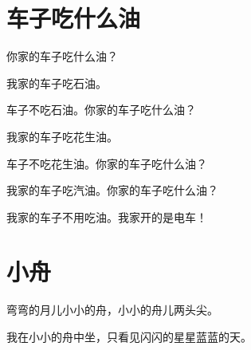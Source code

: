 \documentclass[12pt,UTF-8,openany]{ctexbook}
\begin{document}
\chapter{车子吃什么油}

\begin{large}
    
    你家的车子吃什么油？
    
    我家的车子吃石油。
    
    车子不吃石油。你家的车子吃什么油？
    
    我家的车子吃花生油。
    
    车子不吃花生油。你家的车子吃什么油？
    
    我家的车子吃汽油。你家的车子吃什么油？
    
    我家的车子不用吃油。我家开的是电车！
    
\end{large}


\clearpage

\begin{center}
    
\end{center}


\hanzibox{}\hanzibox{}\hanzibox{}\hanzibox{}\hspace{1em}\hanzibox{}\hanzibox{}\hanzibox{}\hanzibox{}

\hanzibox{}\hanzibox{}\hanzibox{}\hanzibox{}\hspace{1em}\hanzibox{}\hanzibox{}\hanzibox{}\hanzibox{}






\chapter{小舟}

\begin{large}
    
    弯弯的月儿小小的舟，小小的舟儿两头尖。
    
    我在小小的舟中坐，只看见闪闪的星星蓝蓝的天。
    
\end{large}


\clearpage

\begin{center}
    
\end{center}
\end{document}
